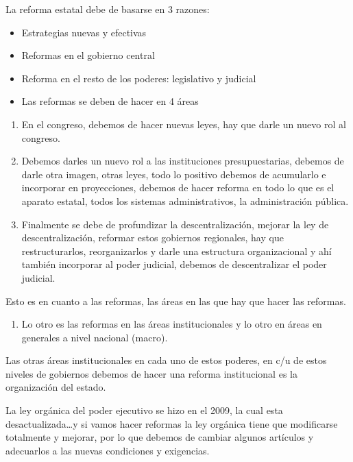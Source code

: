 \documentclass[
  a4paper,
]{article}
\providecommand{\tightlist}{%
  \setlength{\itemsep}{0pt}\setlength{\parskip}{0pt}}\usepackage{longtable,booktabs,array}
\begin{document}
La reforma estatal debe de basarse en 3 razones:

\begin{itemize}
\tightlist
\item
  Estrategias nuevas y efectivas
\item
  Reformas en el gobierno central
\item
  Reforma en el resto de los poderes: legislativo y judicial
\item
  Las reformas se deben de hacer en 4 áreas
\end{itemize}

\begin{enumerate}
\def\labelenumi{\arabic{enumi}.}
\tightlist
\item
  En el congreso, debemos de hacer nuevas leyes, hay que darle un nuevo
  rol al congreso.
\item
  Debemos darles un nuevo rol a las instituciones presupuestarias,
  debemos de darle otra imagen, otras leyes, todo lo positivo debemos de
  acumularlo e incorporar en proyecciones, debemos de hacer reforma en
  todo lo que es el aparato estatal, todos los sistemas administrativos,
  la administración pública.
\item
  Finalmente se debe de profundizar la descentralización, mejorar la ley
  de descentralización, reformar estos gobiernos regionales, hay que
  restructurarlos, reorganizarlos y darle una estructura organizacional
  y ahí también incorporar al poder judicial, debemos de descentralizar
  el poder judicial.
\end{enumerate}

Esto es en cuanto a las reformas, las áreas en las que hay que hacer las
reformas.

\begin{enumerate}
\def\labelenumi{\arabic{enumi}.}
\setcounter{enumi}{3}
\tightlist
\item
  Lo otro es las reformas en las áreas institucionales y lo otro en
  áreas en generales a nivel nacional (macro).
\end{enumerate}

Las otras áreas institucionales en cada uno de estos poderes, en c/u de
estos niveles de gobiernos debemos de hacer una reforma institucional es
la organización del estado.

La ley orgánica del poder ejecutivo se hizo en el 2009, la cual esta
desactualizada\ldots y si vamos hacer reformas la ley orgánica tiene que
modificarse totalmente y mejorar, por lo que debemos de cambiar algunos
artículos y adecuarlos a las nuevas condiciones y exigencias.
\end{document}
